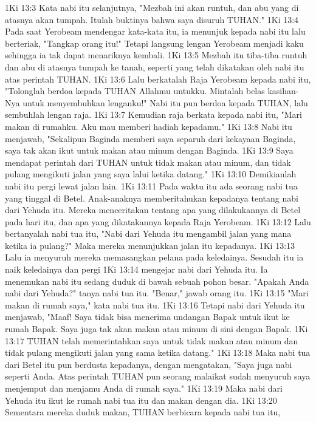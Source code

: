 1Ki 13:3  Kata nabi itu selanjutnya, "Mezbah ini akan runtuh, dan abu yang di atasnya akan tumpah. Itulah buktinya bahwa saya disuruh TUHAN."
1Ki 13:4  Pada saat Yerobeam mendengar kata-kata itu, ia menunjuk kepada nabi itu lalu berteriak, "Tangkap orang itu!" Tetapi langsung lengan Yerobeam menjadi kaku sehingga ia tak dapat menariknya kembali.
1Ki 13:5  Mezbah itu tiba-tiba runtuh dan abu di atasnya tumpah ke tanah, seperti yang telah dikatakan oleh nabi itu atas perintah TUHAN.
1Ki 13:6  Lalu berkatalah Raja Yerobeam kepada nabi itu, "Tolonglah berdoa kepada TUHAN Allahmu untukku. Mintalah belas kasihan-Nya untuk menyembuhkan lenganku!" Nabi itu pun berdoa kepada TUHAN, lalu sembuhlah lengan raja.
1Ki 13:7  Kemudian raja berkata kepada nabi itu, "Mari makan di rumahku. Aku mau memberi hadiah kepadamu."
1Ki 13:8  Nabi itu menjawab, "Sekalipun Baginda memberi saya separuh dari kekayaan Baginda, saya tak akan ikut untuk makan atau minum dengan Baginda.
1Ki 13:9  Saya mendapat perintah dari TUHAN untuk tidak makan atau minum, dan tidak pulang mengikuti jalan yang saya lalui ketika datang."
1Ki 13:10  Demikianlah nabi itu pergi lewat jalan lain.
1Ki 13:11  Pada waktu itu ada seorang nabi tua yang tinggal di Betel. Anak-anaknya memberitahukan kepadanya tentang nabi dari Yehuda itu. Mereka menceritakan tentang apa yang dilakukannya di Betel pada hari itu, dan apa yang dikatakannya kepada Raja Yerobeam.
1Ki 13:12  Lalu bertanyalah nabi tua itu, "Nabi dari Yehuda itu mengambil jalan yang mana ketika ia pulang?" Maka mereka menunjukkan jalan itu kepadanya.
1Ki 13:13  Lalu ia menyuruh mereka memasangkan pelana pada keledainya. Sesudah itu ia naik keledainya dan pergi
1Ki 13:14  mengejar nabi dari Yehuda itu. Ia menemukan nabi itu sedang duduk di bawah sebuah pohon besar. "Apakah Anda nabi dari Yehuda?" tanya nabi tua itu. "Benar," jawab orang itu.
1Ki 13:15  "Mari makan di rumah saya," kata nabi tua itu.
1Ki 13:16  Tetapi nabi dari Yehuda itu menjawab, "Maaf! Saya tidak bisa menerima undangan Bapak untuk ikut ke rumah Bapak. Saya juga tak akan makan atau minum di sini dengan Bapak.
1Ki 13:17  TUHAN telah memerintahkan saya untuk tidak makan atau minum dan tidak pulang mengikuti jalan yang sama ketika datang."
1Ki 13:18  Maka nabi tua dari Betel itu pun berdusta kepadanya, dengan mengatakan, "Saya juga nabi seperti Anda. Atas perintah TUHAN pun seorang malaikat sudah menyuruh saya menjemput dan menjamu Anda di rumah saya."
1Ki 13:19  Maka nabi dari Yehuda itu ikut ke rumah nabi tua itu dan makan dengan dia.
1Ki 13:20  Sementara mereka duduk makan, TUHAN berbicara kepada nabi tua itu,
